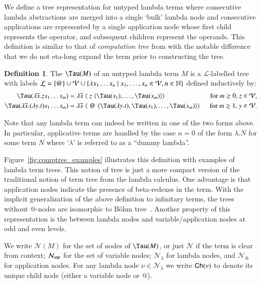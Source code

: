 \documentclass{elsarticle}
\makeatletter
\theoremstyle{plain}
\theoremstyle{definition}
\newtheorem{definition}{Definition}[section]
\newcommand\VarSet{\mathcal{V}}
\newcommand\Nodes{\mathcal{N}}%
\newcommand\NodesVar{\Nodes_{\sf var}}%
\newcommand\NodesLmd{\Nodes_\lambda}%
\newcommand\NodesApp{\Nodes_@}%
\newcommand{\child}{{\small \sf Ch}} %
\newcommand{\ctree}{\Tau} %
\makeatother
\begin{document}
We define a tree representation for untyped lambda terms where consecutive lambda abstractions are merged into a single `bulk' lambda node and consecutive applications are represented by a single application node whose first child represents the operator, and subsequent children represent the operands.
This definition is similar to that of \emph{computation tree} from \cite{OngLics2006, BlumPhd} with the notable difference that we do not eta-long expand the term prior to constructing the tree.
\begin{definition}
The  $\ctree(M)$ of an
 untyped lambda term $M$ is a $\mathcal{L}$-labelled tree
with labels
$\mathcal{L} = \{ @ \} \union \VarSet \union \{ \lambda x_1 \ldots x_n \ | \ x_1 ,\ldots, x_n \in
    \VarSet, n\in\nat \}$
defined inductively by:
\begin{align*}
    \ctree(\lambda \overline{x} . z s_1 \ldots s_m) &= \lambda \overline{x}\; \langle\; z\; \langle \ctree(s_1),\ldots,\ctree(s_m)\rangle\rangle
&    \hbox{for $m\geq 0$, $z \in \VarSet$},
\\
\ctree(\lambda \overline{x} . (\lambda y.t) s_1 \ldots s_m) &= \lambda \overline{x}\; \langle\; @ \; \langle \ctree(\lambda y.t),\ctree(s_1),\ldots,\ctree(s_m) \rangle \rangle \enspace
&  \hbox{for $m\geq 1$, $y\in \VarSet$}.
\end{align*}

Note that any lambda term can indeed be written in one of the two forms above. In particular, applicative terms are handled by the case $n=0$ of the form $\lambda . N$ for some term $N$ where `$\lambda$' is referred to as a ``dummy lambda''.

Figure~\ref{fig:comptree_examples} illustrates this definition with examples of lambda term trees.
This notion of tree is just a more compact version of the traditional notion of term tree from the lambda calculus. One advantage is that application nodes indicate the presence of beta-redexes in the term.
With the implicit generalization of the above definition to infinitary terms,
the trees without @-nodes are isomorphic to B\"ohm tree~\cite{Barendregt84}.
Another property of this representation is the  between lambda nodes and variable/application nodes at odd and even levels.

We write $\Nodes(M)$ for the set of nodes of $\ctree(M)$, or just $\Nodes$ if the term is clear from context; $\NodesVar$ for the set of variable nodes; $\NodesLmd$ for lambda nodes, and $\NodesApp$ for  application nodes. For any lambda node $\nu\in\NodesLmd$ we write $\child(\nu)$ to denote its unique child node (either a variable node or $@$).
\end{definition}
\end{document}
